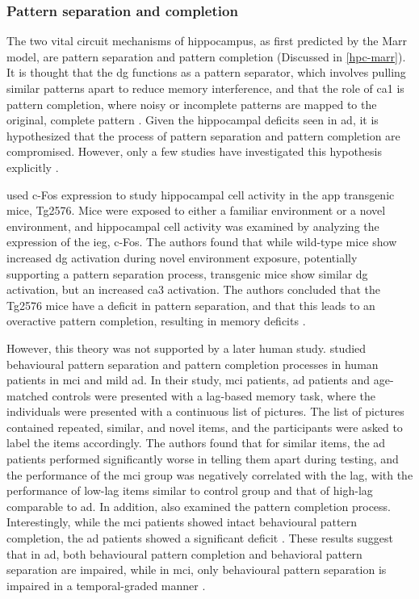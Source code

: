 \subsubsection{Pattern separation and completion}
The two vital circuit mechanisms of hippocampus, as first predicted by the Marr model, are pattern separation and pattern completion (Discussed in \ref{hpc-marr}). It is thought that the \gls{dg} functions as a pattern separator, which involves pulling similar patterns apart to reduce memory interference, and that the role of \gls{ca1} is pattern completion, where noisy or incomplete patterns are mapped to the original, complete pattern \citep{rolls13}. Given the hippocampal deficits seen in \gls{ad}, it is hypothesized that the process of pattern separation and pattern completion are compromised. However, only a few studies have investigated this hypothesis explicitly \citep{maruszak14}. 

\citet{palmer11} used c-Fos expression to study hippocampal cell activity in the \gls{app} transgenic mice, Tg2576. Mice were exposed to either a familiar environment or a novel environment, and hippocampal cell activity was examined by analyzing the expression of the \gls{ieg}, c-Fos. The authors found that while wild-type mice show increased \gls{dg} activation during novel environment exposure, potentially supporting a pattern separation process, transgenic mice show similar \gls{dg} activation, but an increased \gls{ca3} activation. The authors concluded that the Tg2576 mice have a deficit in pattern separation, and that this leads to an overactive pattern completion, resulting in memory deficits \citep{palmer11}.

However, this theory was not supported by a later human study. \citet{ally13} studied behavioural pattern separation and pattern completion processes in human patients in \gls{mci} and mild \gls{ad}. In their study, \gls{mci} patients, \gls{ad} patients and age-matched controls were presented with a lag-based memory task, where the individuals were presented with a continuous list of pictures. The list of pictures contained repeated, similar, and novel items, and the participants were asked to label the items accordingly. The authors found that for similar items, the \gls{ad} patients performed significantly worse in telling them apart during testing, and the performance of the \gls{mci} group was negatively correlated with the lag, with the performance of low-lag items similar to control group and that of high-lag comparable to \gls{ad}.  In addition, \citet{ally13} also examined the pattern completion process. Interestingly, while the \gls{mci} patients showed intact behavioural pattern completion, the \gls{ad} patients showed a significant deficit \citep{ally13}. These results suggest that in \gls{ad}, both behavioural pattern completion and behavioral pattern separation are impaired, while in \gls{mci}, only behavioural pattern separation is impaired in a temporal-graded manner \citep{ally13}.

